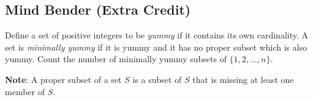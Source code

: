 \documentclass[12pt,letterpaper]{article}
\newcommand\note[1]{\textbf{Note}: #1}
\newcounter{enum22i}
\begin{document}
\subsection*{Mind Bender (Extra Credit)}
{
{\setcounter{enum22i}{0}

  Define a set of positive integers to be \textit{yummy} if it
  contains its own cardinality. A set is \textit{minimally yummy} if it is yummy and it has no proper subset which is also yummy.
  Count the number of minimally yummy subsets of $\{1,2, \dots, n\}$.

  \note{A proper subset of a set $S$ is a subset of $S$ that is missing at least one member of $S$.}
    
}
}
  
\end{document}
